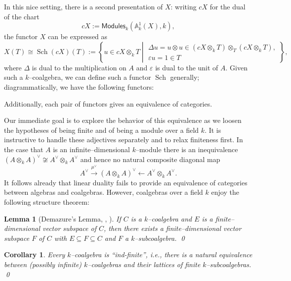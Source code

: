 \documentclass{amsart}
\newcommand{\<}{\langle}
\renewcommand{\>}{\rangle}
\newcommand{\eps}{\varepsilon}
\newcommand{\CatOf}[1]{\mathsf{#1}}
\DeclareMathOperator{\Spec}{Spec}
\DeclareMathOperator{\Sch}{Sch}
\theoremstyle{plain}
\newtheorem*{lemma}{Lemma}
\newtheorem*{corollary}{Corollary}
\theoremstyle{definition}
\theoremstyle{remark}
\begin{document}
In this nice setting, there is a second presentation of $X$: writing $cX$ for the dual of the chart \[cX := \CatOf{Modules}_k(\mathbb A^1_k(X), k),\] the functor $X$ can be expressed as \[X(T) \cong \Sch(cX)(T) := \left\{u \in cX \otimes_k T \middle| \begin{array}{c} \Delta u = u \otimes u \in (cX \otimes_k T) \otimes_T (cX \otimes_k T), \\ \eps u = 1 \in T \end{array}\right\},\] where $\Delta$ is dual to the multiplication on $A$ and $\eps$ is dual to the unit of $A$.  Given such a $k$--coalgebra, we can define such a functor $\Sch$ generally; diagrammatically, we have the following functors:
\begin{center}
\end{center}
Additionally, each pair of functors gives an equivalence of categories.

Our immediate goal is to explore the behavior of this equivalence as we loosen the hypotheses of being finite and of being a module over a field $k$.  It is instructive to handle these adjectives separately and to relax finiteness first.  In the case that $A$ is an infinite--dimensional $k$--module there is an inequivalence $(A \otimes_k A)^\vee \not\cong A^\vee \otimes_k A^\vee$ and hence no natural composite diagonal map \[A^\vee \xrightarrow{\mu^\vee} (A \otimes_k A)^\vee \leftarrow A^\vee \otimes_k A^\vee.\] It follows already that linear duality fails to provide an equivalence of categories between algebras and coalgebras.  However, coalgebras over a field $k$ enjoy the following structure theorem:
\begin{lemma}[Demazure's Lemma, {\cite[pg. 12]{Demazure}, \cite[Appendix 5.3]{Michaelis}}]
If $C$ is a $k$--coalgebra and $E$ is a finite--dimensional vector subspace of $C$, then there exists a finite--dimensional vector subspace $F$ of $C$ with $E \subseteq F \subseteq C$ and $F$ a $k$--subcoalgebra. \qed
\end{lemma}

\begin{corollary}
Every $k$--coalgebra is ``ind-finite'', i.e., there is a natural equivalence between (possibly infinite) $k$--coalgebras and their lattices of finite $k$--subcoalgebras. \qed
\end{corollary}
\end{document}
